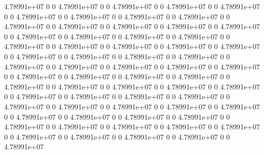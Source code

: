 4.78991e+07 0 0
4.78991e+07 0 0
4.78991e+07 0 0
4.78991e+07 0 0
4.78991e+07 0 0
4.78991e+07 0 0
4.78991e+07 0 0
4.78991e+07 0 0
4.78991e+07 0 0
4.78991e+07 0 0
4.78991e+07 0 0
4.78991e+07 0 0
4.78991e+07 0 0
4.78991e+07 0 0
4.78991e+07 0 0
4.78991e+07 0 0
4.78991e+07 0 0
4.78991e+07 0 0
4.78991e+07 0 0
4.78991e+07 0 0
4.78991e+07 0 0
4.78991e+07 0 0
4.78991e+07 0 0
4.78991e+07 0 0
4.78991e+07 0 0
4.78991e+07 0 0
4.78991e+07 0 0
4.78991e+07 0 0
4.78991e+07 0 0
4.78991e+07 0 0
4.78991e+07 0 0
4.78991e+07 0 0
4.78991e+07 0 0
4.78991e+07 0 0
4.78991e+07 0 0
4.78991e+07 0 0
4.78991e+07 0 0
4.78991e+07 0 0
4.78991e+07 0 0
4.78991e+07 0 0
4.78991e+07 0 0
4.78991e+07 0 0
4.78991e+07 0 0
4.78991e+07 0 0
4.78991e+07 0 0
4.78991e+07 0 0
4.78991e+07 0 0
4.78991e+07 0 0
4.78991e+07 0 0
4.78991e+07 0 0
4.78991e+07 0 0
4.78991e+07 0 0
4.78991e+07 0 0
4.78991e+07 0 0
4.78991e+07 0 0
4.78991e+07 0 0
4.78991e+07 0 0
4.78991e+07 0 0
4.78991e+07 0 0
4.78991e+07 0 0
4.78991e+07 0 0
4.78991e+07 0 0
4.78991e+07 0 0
4.78991e+07